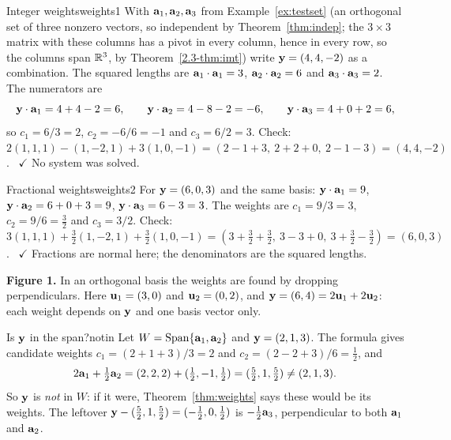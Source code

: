 \documentclass[11pt]{article}
\begin{document}
\begin{exmp}{Integer weights}{weights1}
With $\mathbf{a}_1,\mathbf{a}_2,\mathbf{a}_3$ from Example~\ref{ex:testset} (an orthogonal set of three nonzero vectors, so independent by Theorem~\ref{thm:indep}; the $3\times3$ matrix with these columns has a pivot in every column, hence in every row, so the columns span $\mathbb{R}^3$, by Theorem~\ref{2.3-thm:imt}) write $\mathbf{y}=(4,4,-2)$ as a combination. The squared lengths are $\mathbf{a}_1\cdot\mathbf{a}_1=3$, $\mathbf{a}_2\cdot\mathbf{a}_2=6$ and $\mathbf{a}_3\cdot\mathbf{a}_3=2$. The numerators are
\[
\mathbf{y}\cdot\mathbf{a}_1=4+4-2=6,\qquad\mathbf{y}\cdot\mathbf{a}_2=4-8-2=-6,\qquad\mathbf{y}\cdot\mathbf{a}_3=4+0+2=6,
\]
so $c_1=6/3=2$, $c_2=-6/6=-1$ and $c_3=6/2=3$. Check: $2(1,1,1)-(1,-2,1)+3(1,0,-1)=(2-1+3,\ 2+2+0,\ 2-1-3)=(4,4,-2)$. \ $\checkmark$ No system was solved.
\end{exmp}

\begin{exmp}{Fractional weights}{weights2}
For $\mathbf{y}=(6,0,3)$ and the same basis: $\mathbf{y}\cdot\mathbf{a}_1=9$, $\mathbf{y}\cdot\mathbf{a}_2=6+0+3=9$, $\mathbf{y}\cdot\mathbf{a}_3=6-3=3$. The weights are $c_1=9/3=3$, $c_2=9/6=\tfrac32$ and $c_3=3/2$. Check: $3(1,1,1)+\tfrac32(1,-2,1)+\tfrac32(1,0,-1)=(3+\tfrac32+\tfrac32,\ 3-3+0,\ 3+\tfrac32-\tfrac32)=(6,0,3)$. \ $\checkmark$ Fractions are normal here; the denominators are the squared lengths.
\end{exmp}

\begin{center}
\end{center}

\noindent\textbf{Figure 1.} In an orthogonal basis the weights are found by dropping perpendiculars. Here $\mathbf{u}_1=(3,0)$ and $\mathbf{u}_2=(0,2)$, and $\mathbf{y}=(6,4)=2\mathbf{u}_1+2\mathbf{u}_2$: each weight depends on $\mathbf{y}$ and one basis vector only.

\begin{exmp}{Is $\mathbf{y}$ in the span?}{notin}
Let $W=\operatorname{Span}\{\mathbf{a}_1,\mathbf{a}_2\}$ and $\mathbf{y}=(2,1,3)$. The formula gives candidate weights $c_1=(2+1+3)/3=2$ and $c_2=(2-2+3)/6=\tfrac12$, and
\[
2\mathbf{a}_1+\tfrac12\mathbf{a}_2=(2,2,2)+(\tfrac12,-1,\tfrac12)=(\tfrac52,1,\tfrac52)\neq(2,1,3).
\]
So $\mathbf{y}$ is \emph{not} in $W$: if it were, Theorem~\ref{thm:weights} says these would be its weights. The leftover $\mathbf{y}-(\tfrac52,1,\tfrac52)=(-\tfrac12,0,\tfrac12)$ is $-\tfrac12\mathbf{a}_3$, perpendicular to both $\mathbf{a}_1$ and $\mathbf{a}_2$.
\end{exmp}
\end{document}
